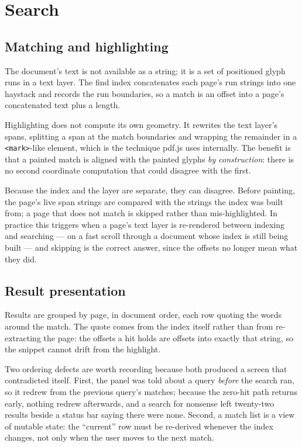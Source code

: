 \section{Search}
\label{sec:search}

\subsection{Matching and highlighting}

The document's text is not available as a string; it is a set of positioned glyph runs in a
text layer. The find index concatenates each page's run strings into one haystack and records
the run boundaries, so a match is an offset into a page's concatenated text plus a length.

Highlighting does not compute its own geometry. It rewrites the text layer's spans, splitting
a span at the match boundaries and wrapping the remainder in a \texttt{<mark>}-like element,
which is the technique pdf.js uses internally. The benefit is that a painted match is aligned
with the painted glyphs \emph{by construction}: there is no second coordinate computation that
could disagree with the first.

Because the index and the layer are separate, they can disagree. Before painting, the page's
live span strings are compared with the strings the index was built from; a page that does not
match is skipped rather than mis-highlighted. In practice this triggers when a page's text
layer is re-rendered between indexing and searching --- on a fast scroll through a document
whose index is still being built --- and skipping is the correct answer, since the offsets no
longer mean what they did.

\subsection{Result presentation}

Results are grouped by page, in document order, each row quoting the words around the match.
The quote comes from the index itself rather than from re-extracting the page: the offsets a
hit holds are offsets into exactly that string, so the snippet cannot drift from the
highlight.

Two ordering defects are worth recording because both produced a screen that contradicted
itself. First, the panel was told about a query \emph{before} the search ran, so it redrew from
the previous query's matches; because the zero-hit path returns early, nothing redrew
afterwards, and a search for nonsense left twenty-two results beside a status bar saying there
were none. Second, a match list is a view of mutable state: the ``current'' row must be
re-derived whenever the index changes, not only when the user moves to the next match.

